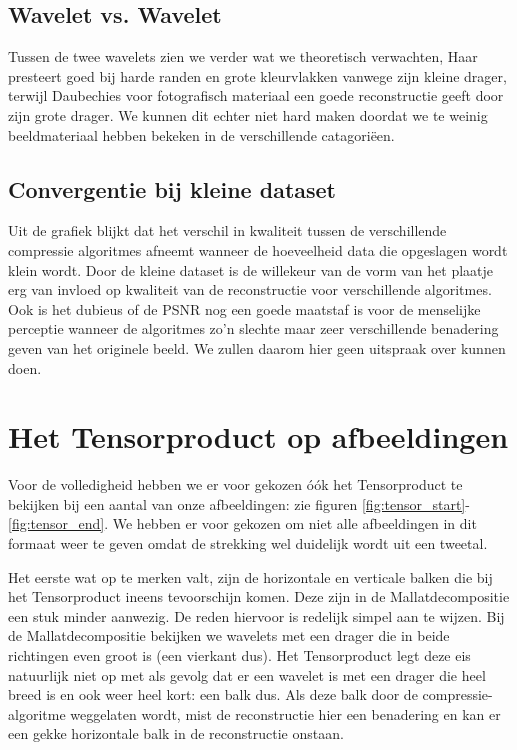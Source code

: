 \subsection{Wavelet vs. Wavelet}
Tussen de twee wavelets zien we verder wat we theoretisch verwachten, Haar presteert goed bij harde randen en grote kleurvlakken
vanwege zijn kleine drager, terwijl Daubechies voor fotografisch materiaal een goede reconstructie geeft door zijn grote drager.
We kunnen dit echter niet hard maken doordat we te weinig beeldmateriaal hebben bekeken in de verschillende catagori\"een. 

\subsection{Convergentie bij kleine dataset}
Uit de grafiek blijkt dat het verschil in kwaliteit tussen de verschillende compressie algoritmes afneemt wanneer
de hoeveelheid data die opgeslagen wordt klein wordt. 
Door de kleine dataset is de willekeur van de vorm van het plaatje erg van invloed op kwaliteit van de reconstructie 
voor verschillende algoritmes. 
Ook is het dubieus of de PSNR nog een goede maatstaf is voor de menselijke perceptie wanneer de algoritmes
zo'n slechte maar zeer verschillende benadering geven van het originele beeld.
We zullen daarom hier geen uitspraak over kunnen doen.

\section{Het Tensorproduct op afbeeldingen}
Voor de volledigheid hebben we er voor gekozen \'o\'ok het Tensorproduct te bekijken bij een aantal van onze afbeeldingen: zie figuren \ref{fig:tensor_start}-\ref{fig:tensor_end}. We hebben er voor gekozen om niet alle afbeeldingen in dit formaat weer te geven omdat de strekking wel duidelijk wordt uit een tweetal.

Het eerste wat op te merken valt, zijn de horizontale en verticale balken die bij het Tensorproduct ineens tevoorschijn komen. Deze zijn in de Mallatdecompositie een stuk minder aanwezig. De reden hiervoor is redelijk simpel aan te wijzen. Bij de Mallatdecompositie bekijken we wavelets met een drager die in beide richtingen even groot is (een vierkant dus). Het Tensorproduct legt deze eis natuurlijk niet op met als gevolg dat er een wavelet is met een drager die heel breed is en ook weer heel kort: een balk dus. Als deze balk door de compressie-algoritme weggelaten wordt, mist de reconstructie hier een benadering en kan er een gekke horizontale balk in de reconstructie onstaan.

